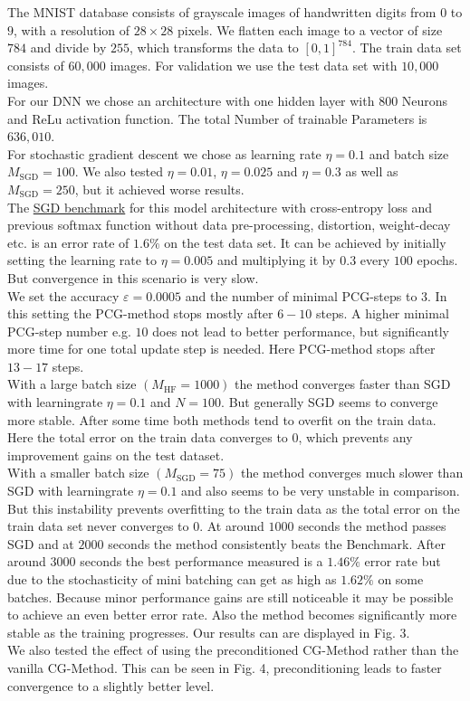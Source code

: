 \documentclass[conference]{IEEEtran}
\begin{document}
	\noindent
	The MNIST database consists of grayscale images of handwritten digits from $0$ to $9$, with a resolution of $28\times28$ pixels. We flatten each image to a vector of size $784$ and divide by $255$, which transforms the data to $[0,1]^{784}$. The train data set consists of $60,000$ images. For validation we use the test data set with $10,000$ images.\\
	For our DNN we chose an architecture with one hidden layer with $800$ Neurons and ReLu activation function. The total Number of trainable Parameters is $636,010$.\\
	For stochastic gradient descent we chose as learning rate $\eta=0.1$ and batch size $M_{\mathrm{SGD}}=100$. We also tested $\eta=0.01$, $\eta=0.025$ and $\eta=0.3$ as well as $M_{\mathrm{SGD}}=250$, but it achieved worse results. \\
	The \href{https://en.wikipedia.org/wiki/MNIST_database}{SGD benchmark} for this model architecture with cross-entropy loss and previous softmax function without data pre-processing, distortion, weight-decay etc. is an error rate of $1.6\%$ on the test data set.
	It can be achieved by initially setting the learning rate to $\eta=0.005$ and multiplying it by $0.3$ every $100$ epochs. But convergence in this scenario is very slow.\\
	\noindent
	We set the accuracy $\varepsilon=0.0005$ and the number of minimal PCG-steps to $3$. In this setting the PCG-method stops mostly after $6-10$ steps. A higher minimal PCG-step number e.g. $10$ does not lead to better performance, but significantly more time for one total update step is needed. Here PCG-method stops after $13-17$ steps.\\
	With a large batch size $(M_{\mathrm{HF}}=1000)$ the method converges faster than SGD with learningrate $\eta=0.1$ and $N=100.$ But generally SGD seems to converge more stable. After some time both methods tend to overfit on the train data. Here the total error on the train data converges to $0$, which prevents any improvement gains on the test dataset.\\
	With a smaller batch size $(M_{\mathrm{SGD}}=75)$ the method converges much slower than SGD with learningrate $\eta=0.1$ and also seems to be very unstable in comparison. But this instability prevents overfitting to the train data as the total error on the train data set never converges to $0$. At around $1000$ seconds the method passes SGD and at $2000$ seconds the method consistently beats the Benchmark. After around $3000$ seconds the best performance measured is a $1.46\%$ error rate but due to the stochasticity of mini batching can get as high as $1.62\%$ on some batches. Because minor performance gains are still noticeable it may be possible to achieve an even better error rate.
	Also the method becomes significantly more stable as the training progresses. Our results can are displayed in Fig. 3.\\
	We also tested the effect of using the preconditioned CG-Method rather than the vanilla CG-Method. This can be seen in Fig. 4, preconditioning leads to faster convergence to a slightly better level.
	
\end{document}
